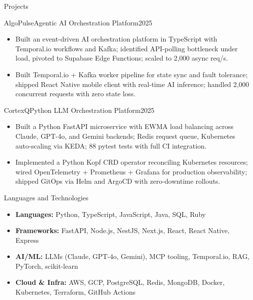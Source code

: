 \documentclass[]{mcdowellcv}
\begin{document}
\begin{cvsection}{Projects}
  \begin{cvsubsection}{AlgoPulse}{Agentic AI Orchestration Platform}{2025}
    \begin{itemize}
      \item Built an event-driven AI orchestration platform in TypeScript with Temporal.io workflows and Kafka; identified API-polling bottleneck under load, pivoted to Supabase Edge Functions; scaled to 2,000 async req/s.
      \item Built Temporal.io + Kafka worker pipeline for state sync and fault tolerance; shipped React Native mobile client with real-time AI inference; handled 2,000 concurrent requests with zero state loss.
    \end{itemize}
    \vspace{-1.5pt}
  \end{cvsubsection}

  \begin{cvsubsection}{CortexQ}{Python LLM Orchestration Platform}{2025}
    \begin{itemize}
      \item Built a Python FastAPI microservice with EWMA load balancing across Claude, GPT-4o, and Gemini backends; Redis request queue, Kubernetes auto-scaling via KEDA; 88 pytest tests with full CI integration.
      \item Implemented a Python Kopf CRD operator reconciling Kubernetes resources; wired OpenTelemetry + Prometheus + Grafana for production observability; shipped GitOps via Helm and ArgoCD with zero-downtime rollouts.
    \end{itemize}
    \vspace{-1.5pt}
  \end{cvsubsection}
\end{cvsection}

\begin{cvsection}{Languages and Technologies}
  \begin{cvsubsection}{}{}{}
    \begin{itemize}
      \item \textbf{Languages:} Python, TypeScript, JavaScript, Java, SQL, Ruby
      \item \textbf{Frameworks:} FastAPI, Node.js, NestJS, Next.js, React, React Native, Express
      \item \textbf{AI/ML:} LLMs (Claude, GPT-4o, Gemini), MCP tooling, Temporal.io, RAG, PyTorch, scikit-learn
      \item \textbf{Cloud \& Infra:} AWS, GCP, PostgreSQL, Redis, MongoDB, Docker, Kubernetes, Terraform, GitHub Actions
    \end{itemize}
  \end{cvsubsection}
\end{cvsection}
\end{document}

